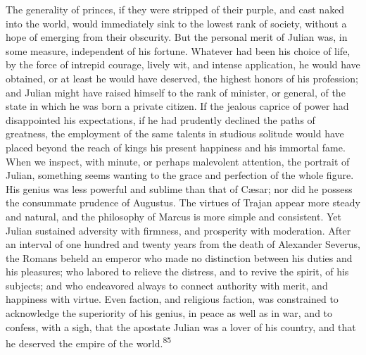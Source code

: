 The generality of princes, if they were stripped of their purple,
and cast naked into the world, would immediately sink to the
lowest rank of society, without a hope of emerging from their
obscurity. But the personal merit of Julian was, in some measure,
independent of his fortune. Whatever had been his choice of life,
by the force of intrepid courage, lively wit, and intense
application, he would have obtained, or at least he would have
deserved, the highest honors of his profession; and Julian might
have raised himself to the rank of minister, or general, of the
state in which he was born a private citizen. If the jealous
caprice of power had disappointed his expectations, if he had
prudently declined the paths of greatness, the employment of the
same talents in studious solitude would have placed beyond the
reach of kings his present happiness and his immortal fame. When
we inspect, with minute, or perhaps malevolent attention, the
portrait of Julian, something seems wanting to the grace and
perfection of the whole figure. His genius was less powerful and
sublime than that of Cæsar; nor did he possess the consummate
prudence of Augustus. The virtues of Trajan appear more steady
and natural, and the philosophy of Marcus is more simple and
consistent. Yet Julian sustained adversity with firmness, and
prosperity with moderation. After an interval of one hundred and
twenty years from the death of Alexander Severus, the Romans
beheld an emperor who made no distinction between his duties and
his pleasures; who labored to relieve the distress, and to revive
the spirit, of his subjects; and who endeavored always to connect
authority with merit, and happiness with virtue. Even faction,
and religious faction, was constrained to acknowledge the
superiority of his genius, in peace as well as in war, and to
confess, with a sigh, that the apostate Julian was a lover of his
country, and that he deserved the empire of the world.\textsuperscript{85}


